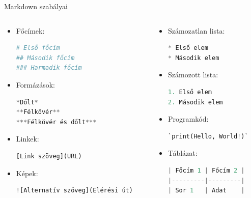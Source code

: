 \documentclass[english, aspectratio=169]{beamer}
\begin{document}
\begin{frame}[fragile]{Markdown szabályai}
	\begin{columns}
		\begin{column}{.5\textwidth}
			\begin{itemize}
				\item Főcímek:
				\begin{lstlisting}[language=python]
# Első főcím
## Második főcím
### Harmadik főcím
				\end{lstlisting}
				\item Formázások:
				\begin{lstlisting}[language=python]
*Dőlt*
**Félkövér**
***Félkövér és dőlt***
				\end{lstlisting}
				\item Linkek:
				\begin{lstlisting}[language=python]
[Link szöveg](URL)
				\end{lstlisting}
				\item Képek:
				\begin{lstlisting}[language=python]
![Alternatív szöveg](Elérési út)
				\end{lstlisting}
			\end{itemize}
		\end{column}
		\begin{column}{.5\textwidth}
			\begin{itemize}
				\item Számozatlan lista:
				\begin{lstlisting}[language=python]
* Első elem
* Második elem
				\end{lstlisting}
				\item Számozott lista: 
				\begin{lstlisting}[language=python]
1. Első elem
2. Második elem
				\end{lstlisting}
				\item Programkód:
				\begin{lstlisting}[language=python]
`print(Hello, World!)`
				\end{lstlisting}
				\item Táblázat:
				\begin{lstlisting}[language=python]
| Főcím 1 | Főcím 2 |
|---------|---------|
| Sor 1   | Adat    |
				\end{lstlisting}
			\end{itemize}
		\end{column}
	\end{columns}
\end{frame}
\end{document}

